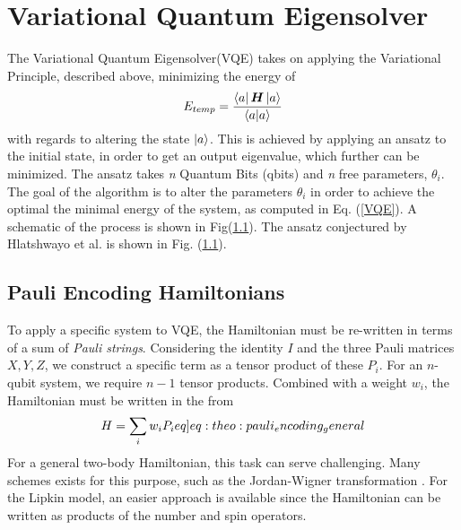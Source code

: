 \section{Variational Quantum Eigensolver}
The Variational Quantum Eigensolver(VQE) takes on applying the Variational Principle, described above, minimizing the energy of 
\begin{equation}\label{VQE}
    E_{temp} = \frac{\bra{a}\boldsymbol{H}\ket{a}}{\braket{a}}
\end{equation}
with regards to altering the state $\ket{a}$. This is achieved by applying an ansatz to the initial state, in order to get an output eigenvalue, which further can be minimized. The ansatz takes \textit{n} Quantum Bits (qbits) and \textit{n} free parameters, $\theta_i$. The goal of the algorithm is to alter the parameters $\theta_i$ in order to achieve the optimal the minimal energy of the system, as computed in Eq. (\ref{VQE}). A schematic of the process is shown in Fig(\ref{}). The ansatz conjectured by Hlatshwayo et al. \cite{} is shown in Fig. (\ref{}). 

\subsection{Pauli Encoding Hamiltonians}
To apply a specific system to VQE, the Hamiltonian must be re-written in terms of a sum of \textit{Pauli strings}. Considering the identity $I$ and the three Pauli matrices $X, Y, Z$, we construct a specific term as a tensor product of these $P_i$. For an $n$-qubit system, we require $n-1$ tensor products. Combined with a weight $w_i$, the Hamiltonian must be written in the from
\begin{align}
    H = \sum_i w_i P_i \label[eq]{eq:theo:pauli_encoding_general}
\end{align}
For a general two-body Hamiltonian, this task can serve challenging. Many schemes exists for this purpose, such as the Jordan-Wigner transformation \citep{steudtnerMethodsSimulateFermions2019}. For the Lipkin model, an easier approach is available since the Hamiltonian can be written as products of the number and spin operators.